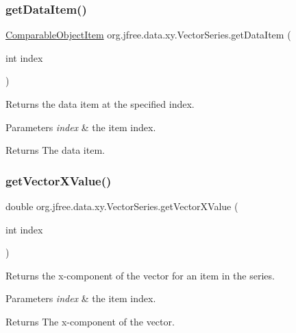 \subsubsection{\texorpdfstring{get\+Data\+Item()}{getDataItem()}}
{\footnotesize\ttfamily \mbox{\hyperlink{classorg_1_1jfree_1_1data_1_1_comparable_object_item}{Comparable\+Object\+Item}} org.\+jfree.\+data.\+xy.\+Vector\+Series.\+get\+Data\+Item (\begin{DoxyParamCaption}\item[{int}]{index }\end{DoxyParamCaption})}

Returns the data item at the specified index.


\begin{DoxyParams}{Parameters}
{\em index} & the item index.\\
\hline
\end{DoxyParams}
\begin{DoxyReturn}{Returns}
The data item. 
\end{DoxyReturn}
\mbox{\label{classorg_1_1jfree_1_1data_1_1xy_1_1_vector_series_ab3fe72017d4383a94620bb705cfb57eb}} 
\subsubsection{\texorpdfstring{get\+Vector\+X\+Value()}{getVectorXValue()}}
{\footnotesize\ttfamily double org.\+jfree.\+data.\+xy.\+Vector\+Series.\+get\+Vector\+X\+Value (\begin{DoxyParamCaption}\item[{int}]{index }\end{DoxyParamCaption})}

Returns the x-\/component of the vector for an item in the series.


\begin{DoxyParams}{Parameters}
{\em index} & the item index.\\
\hline
\end{DoxyParams}
\begin{DoxyReturn}{Returns}
The x-\/component of the vector. 
\end{DoxyReturn}
\mbox{\label{classorg_1_1jfree_1_1data_1_1xy_1_1_vector_series_a955aedde3f6bf7bfb7bc71331ab3f438}} 

